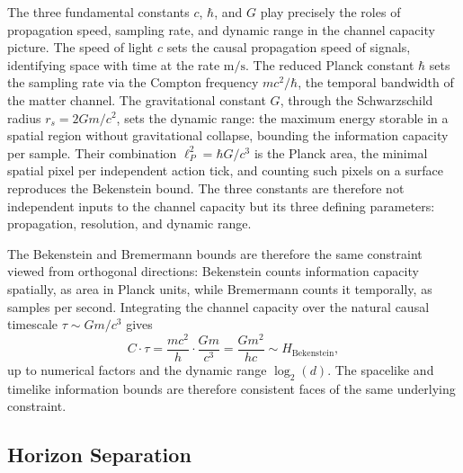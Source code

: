 \documentclass[12pt,a4paper]{article}
\begin{document}
The three fundamental constants $c$, $\hbar$, and $G$ play 
precisely the roles of propagation speed, sampling rate, and 
dynamic range in the channel capacity picture. The speed of 
light $c$ sets the causal propagation speed of signals, 
identifying space with time at the rate $\text{m/s}$. The 
reduced Planck constant $\hbar$ sets the sampling rate via 
the Compton frequency $mc^2/\hbar$, the temporal bandwidth 
of the matter channel. The gravitational constant $G$, 
through the Schwarzschild radius $r_s = 2Gm/c^2$, sets the 
dynamic range: the maximum energy storable in a spatial 
region without gravitational collapse, bounding the 
information capacity per sample. Their combination 
$\ell_P^2 = \hbar G/c^3$ is the Planck area, the minimal 
spatial pixel per independent action tick, and counting 
such pixels on a surface reproduces the Bekenstein bound. 
The three constants are therefore not independent inputs to 
the channel capacity but its three defining parameters: 
propagation, resolution, and dynamic range.


The Bekenstein and Bremermann bounds are therefore the same 
constraint viewed from orthogonal directions: Bekenstein counts 
information capacity spatially, as area in Planck units, while 
Bremermann counts it temporally, as samples per second. 
Integrating the channel capacity over the natural causal 
timescale $\tau \sim Gm/c^3$ gives
\begin{equation}
    C \cdot \tau = \frac{mc^2}{h} \cdot \frac{Gm}{c^3} 
    = \frac{Gm^2}{hc} \sim H_{\mathrm{Bekenstein}},
\end{equation}
up to numerical factors and the dynamic range $\log_2(d)$. 
The spacelike and timelike information bounds are 
therefore consistent faces of the same underlying constraint.


\subsection{Horizon Separation}
\end{document}
